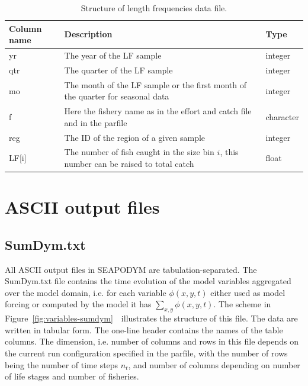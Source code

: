 \begin{table}[H]
\caption{Structure of {\ttfamily length frequencies} data file.}
  \vspace{0.5cm}
\begin{tabular}{p{1.65cm}p{12.0cm}p{1.75cm}}
    \hline
   {\bfseries Column name} & {\bfseries Description} & {\bfseries Type}\\ \hline\hline
    {\ttfamily yr}& The year of the LF sample & integer \\ \hline
    {\ttfamily qtr}& The quarter of the LF sample & integer \\ \hline
    {\ttfamily mo}& The month of the LF sample or the first month of the quarter for seasonal data & integer \\ \hline    
    {\ttfamily f}& Here the fishery name as in the effort and catch file and in the parfile & character \\ \hline
    {\ttfamily reg} & The ID of the region of a given sample & integer\\ \hline
    {\ttfamily LF[i]} & The number of fish caught in the size bin $i$, this number can be raised to total catch & float  \\ \hline
\end{tabular}
\label{tab:LF-fformat}
\end{table}

\section{ASCII output files}\label{annex:text-files}

\subsection{SumDym.txt}\label{annex:sumdym}

All ASCII output files in SEAPODYM are tabulation-separated. The SumDym.txt file contains the time evolution of the model variables aggregated over the model domain, i.e. for each variable $\phi(x,y,t)$ either used as model forcing or computed by the model it has $\sum\limits_{x,y}\phi(x,y,t)$. The scheme in Figure~\ref{fig:variables-sumdym}~\ illustrates the structure of this file. The data are written in tabular form. The one-line header contains the names of the table columns. The dimension, i.e. number of columns and rows in this file depends on the current run configuration specified in the parfile, with the number of rows being the number of time steps $n_{t}$, and number of columns depending on number of life stages and number of fisheries. 

